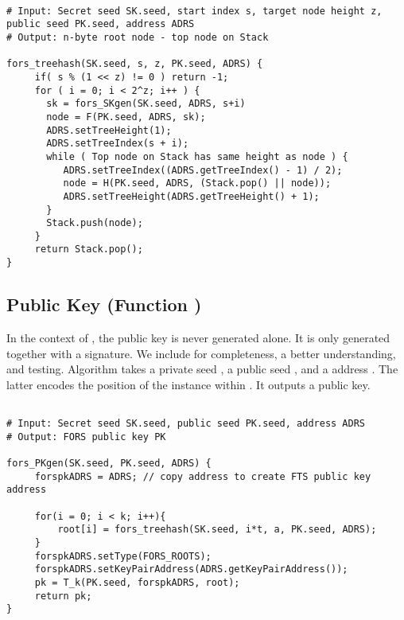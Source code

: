    \begin{lstlisting}[breaklines=true, label=algo:forstreehash, language=pseudoc,
                   caption=The \forstreehash algorithm.]

# Input: Secret seed SK.seed, start index s, target node height z, public seed PK.seed, address ADRS
# Output: n-byte root node - top node on Stack

fors_treehash(SK.seed, s, z, PK.seed, ADRS) {
     if( s % (1 << z) != 0 ) return -1;
     for ( i = 0; i < 2^z; i++ ) {
       sk = fors_SKgen(SK.seed, ADRS, s+i)
       node = F(PK.seed, ADRS, sk);
       ADRS.setTreeHeight(1);
       ADRS.setTreeIndex(s + i);
       while ( Top node on Stack has same height as node ) {
          ADRS.setTreeIndex((ADRS.getTreeIndex() - 1) / 2);
          node = H(PK.seed, ADRS, (Stack.pop() || node));
          ADRS.setTreeHeight(ADRS.getTreeHeight() + 1);
       }
       Stack.push(node);
     }
     return Stack.pop();
}

\end{lstlisting}

\subsection{\fors Public Key (Function \forspkgen)}
In the context of \spx, the \fors public key is never generated alone. It is
only generated together with a signature. We include \forspkgen
for completeness, a better understanding, and testing. Algorithm \forspkgen takes
a private seed \sseed, a public seed \pseed, and a \fors address \adrs. The
latter encodes the position of the \fors instance within \spx. It outputs a
\fors public key.

\begin{lstlisting}[label=alg:fors:pkgen, language=pseudoc,
                   caption=\forspkgen\ -- Generate a FORS public key.]

# Input: Secret seed SK.seed, public seed PK.seed, address ADRS
# Output: FORS public key PK

fors_PKgen(SK.seed, PK.seed, ADRS) {
     forspkADRS = ADRS; // copy address to create FTS public key address

     for(i = 0; i < k; i++){
         root[i] = fors_treehash(SK.seed, i*t, a, PK.seed, ADRS);
     }
     forspkADRS.setType(FORS_ROOTS);
     forspkADRS.setKeyPairAddress(ADRS.getKeyPairAddress());
     pk = T_k(PK.seed, forspkADRS, root);
     return pk;
}
\end{lstlisting}

